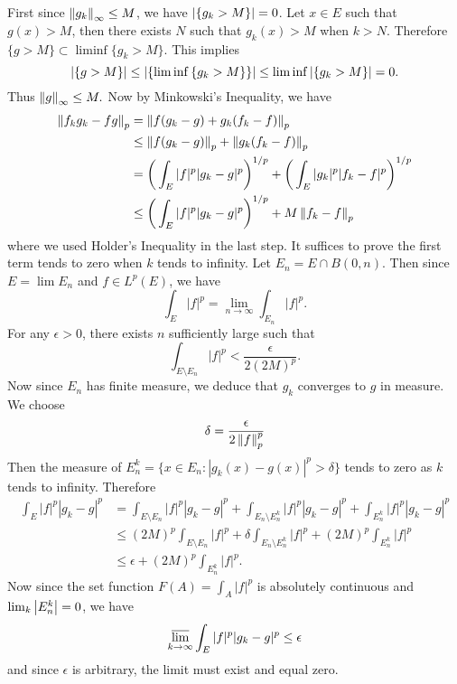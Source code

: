\begin{exercise}{8.11}
  First since $\left\|g_k\right\|_{\infty}\leq M$, we have $\left\vert\{g_k>M\}\right\vert=0$. Let $x\in E$ such that $g(x)>M$, then there exists $N$ such that $g_k(x)>M$ when $k>N$. Therefore $\{g>M\}\subset\liminf{\{g_k>M\}}$. This implies
  \[
    \left\vert\{g>M\}\right\vert\leq\left\vert\{\liminf{\{g_k>M\}}\}\right\vert\leq\liminf{\left\vert\{g_k>M\}\right\vert}=0.
  \]
  Thus $\left\|g\right\|_{\infty}\leq M.$ Now by Minkowski's Inequality, we have
  \begin{align*}
    \left\|f_kg_k-fg\right\|_p&=\left\|f(g_k-g)+g_k(f_k-f)\right\|_p\\
    &\leq \left\|f(g_k-g)\right\|_p+\left\|g_k(f_k-f)\right\|_p\\
    &=\bigg(\int_E|f|^p|g_k-g|^p\bigg)^{1/p}+\bigg(\int_E|g_k|^p|f_k-f|^p\bigg)^{1/p}\\
    &\leq \bigg(\int_E|f|^p|g_k-g|^p\bigg)^{1/p}+M\left\|f_k-f\right\|_p
  \end{align*}
  where we used Holder's Inequality in the last step. It suffices to prove the first term tends to zero when $k$ tends to infinity. Let $E_n=E\cap B(0,n)$. Then since $E=\lim E_n$ and $f\in L^p(E)$, we have
  \[
    \int_E|f|^p=\lim_{n\rightarrow\infty}\int_{E_n}|f|^p.
  \]
  For any $\epsilon>0$, there exists $n$ sufficiently large such that 
  \[
    \int_{E\setminus E_n}|f|^p<\frac{\epsilon}{2(2M)^p}.
  \]
  Now since $E_n$ has finite measure, we deduce that $g_k$ converges to $g$ in measure. We choose 
  \[
    \delta=\frac{\epsilon}{2\left\|f\right\|_p^p}
  \]
  Then the measure of $E_n^k=\{x\in E_n:|g_k(x)-g(x)|^p>\delta\}$ tends to zero as $k$ tends to infinity. Therefore
  \begin{align*}
      \int_E|f|^p|g_k-g|^p&=\int_{E\setminus E_n}|f|^p|g_k-g|^p+\int_{E_n\setminus E_n^k}|f|^p|g_k-g|^p+\int_{E_n^k}|f|^p|g_k-g|^p\\
      &\leq (2M)^p\int_{E\setminus E_n}|f|^p+\delta\int_{E_n\setminus E_n^k}|f|^p+(2M)^p\int_{E_n^k}|f|^p\\
      &\leq\epsilon+(2M)^p\int_{E_n^k}|f|^p.
  \end{align*}
  Now since the set function $F(A)=\int_A|f|^p$ is absolutely continuous and $\lim_k\left\vert E_n^k\right\vert=0$, we have
  \[
    \varlimsup_{k\rightarrow \infty}\int_E|f|^p|g_k-g|^p\leq\epsilon
  \]
  and since $\epsilon$ is arbitrary, the limit must exist and equal zero.
\end{exercise}

